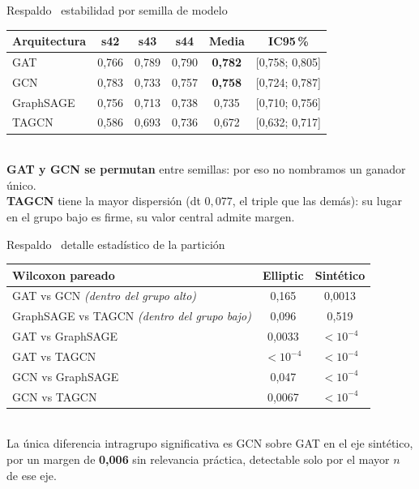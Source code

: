 \documentclass[aspectratio=169,11pt]{beamer}
\begin{document}
\begin{frame}{Respaldo \textperiodcentered\ estabilidad por semilla de modelo}
\begin{center}
\small
\renewcommand{\arraystretch}{1.3}
\begin{tabular}{lccccc}
\toprule
\textbf{Arquitectura} & \textbf{s42} & \textbf{s43} & \textbf{s44} & \textbf{Media} & \textbf{IC95\,\%} \\
\midrule
GAT       & 0,766 & 0,789 & 0,790 & \textbf{0,782} & [0,758; 0,805] \\
GCN       & 0,783 & 0,733 & 0,757 & \textbf{0,758} & [0,724; 0,787] \\
GraphSAGE & 0,756 & 0,713 & 0,738 & 0,735 & [0,710; 0,756] \\
TAGCN     & 0,586 & 0,693 & 0,736 & 0,672 & [0,632; 0,717] \\
\bottomrule
\end{tabular}
\\[9pt]
\footnotesize
\textbf{GAT y GCN se permutan} entre semillas: por eso no nombramos un ganador único.\\
\textbf{TAGCN} tiene la mayor dispersión (dt $0{,}077$, el triple que las demás): su lugar en el grupo bajo es firme, su valor central admite margen.
\end{center}
\end{frame}

\begin{frame}{Respaldo \textperiodcentered\ detalle estadístico de la partición}
\begin{center}
\footnotesize
\renewcommand{\arraystretch}{1.25}
\begin{tabular}{lcc}
\toprule
\textbf{Wilcoxon pareado} & \textbf{Elliptic} & \textbf{Sintético} \\
\midrule
GAT vs GCN \hfill \textit{(dentro del grupo alto)} & 0,165 & 0,0013 \\
GraphSAGE vs TAGCN \hfill \textit{(dentro del grupo bajo)} & 0,096 & 0,519 \\
\midrule
GAT vs GraphSAGE & 0,0033 & $<10^{-4}$ \\
GAT vs TAGCN & $<10^{-4}$ & $<10^{-4}$ \\
GCN vs GraphSAGE & 0,047 & $<10^{-4}$ \\
GCN vs TAGCN & 0,0067 & $<10^{-4}$ \\
\bottomrule
\end{tabular}
\\[8pt]
\footnotesize
La única diferencia intragrupo significativa es GCN sobre GAT en el eje sintético,\\
por un margen de \textbf{0,006} sin relevancia práctica, detectable solo por el mayor $n$ de ese eje.
\end{center}
\end{frame}
\end{document}
